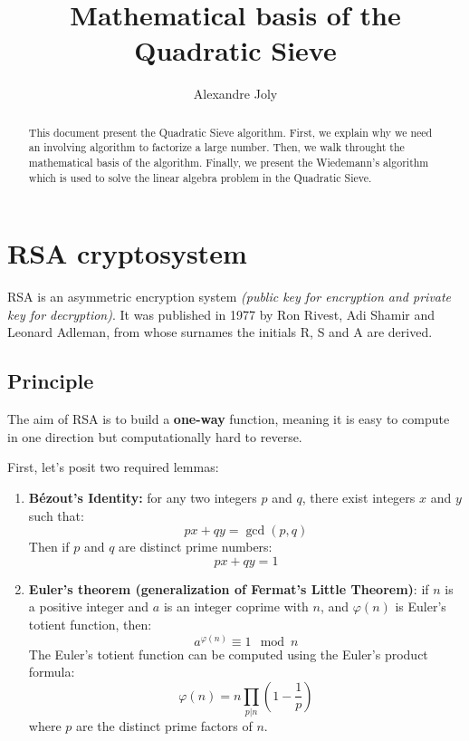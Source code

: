 \documentclass[a4paper, 11pt]{article}
\title{Mathematical basis of the Quadratic Sieve}
\author{Alexandre Joly}
\begin{document}
\maketitle

\begin{abstract}
    This document present the Quadratic Sieve algorithm. First, we explain why we need an involving algorithm to factorize a large number. Then, we walk throught the mathematical basis of the algorithm. 
    Finally, we present the Wiedemann's algorithm which is used to solve the linear algebra problem in the Quadratic Sieve.
\end{abstract}

\tableofcontents
\newpage


\section{RSA cryptosystem}

RSA is an asymmetric encryption system \textit{(public key for encryption and private key for decryption)}. It was published in 1977 \cite{RSA1978} by Ron Rivest, Adi Shamir and Leonard Adleman, from whose surnames the initials R, S and A are derived.

\subsection{Principle}
The aim of RSA is to build a \textbf{one-way} function, meaning it is easy to compute in one direction but computationally hard to reverse.

First, let's posit two required lemmas:
\begin{enumerate}
    \item \textbf{Bézout's Identity:} for any two integers $p$ and $q$, there exist integers $x$ and $y$ such that:
    \begin{equation}
        px+qy= \gcd(p,q) 
    \end{equation}
    Then if $p$ and $q$ are distinct prime numbers:
    \begin{equation}
        px+qy= 1
    \end{equation}
    \item \textbf{Euler's theorem (generalization of Fermat's Little Theorem)}: if $n$ is a positive integer and $a$ is an integer coprime with $n$, and $\varphi(n)$ is Euler's totient function, then:
    \begin{equation}
        a^{\varphi(n)} \equiv 1 \mod n
    \end{equation}
    The Euler's totient function can be computed using the Euler's product formula:
    \begin{equation}
        \varphi(n) = n \prod_{p|n}\left(1-\frac{1}{p}\right)
    \end{equation}
    where $p$ are the distinct prime factors of $n$.
\end{enumerate}
\end{document}
